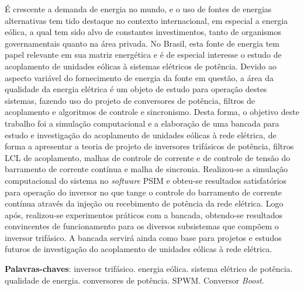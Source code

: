 \begin{resumo}
 
É crescente a demanda de energia no mundo, e o uso de fontes de energias alternativas tem tido destaque no contexto 
internacional, em especial a energia eólica, a qual tem sido alvo de constantes investimentos, tanto de organismos 
governamentais quanto na área privada. No Brasil, esta fonte de energia tem papel relevante em sua matriz energética e 
é de especial interesse o estudo de acoplamento de unidades eólicas à sistemas elétricos de potência. 
Devido ao aspecto variável do fornecimento de energia da fonte em questão, a área da qualidade da energia elétrica 
é um objeto de estudo para operação destes sistemas, fazendo uso do projeto de conversores de potência, filtros de 
acoplamento e algoritmos de controle e sincronismo. Desta forma, o objetivo deste trabalho foi a simulação computacional 
e a elaboração de uma bancada para estudo e investigação do acoplamento de unidades eólicas à rede elétrica, de forma 
a apresentar a teoria de projeto de inversores trifásicos de potência, filtros LCL de acoplamento, 
malhas de controle de corrente e de controle de tensão do barramento de corrente contínua e malha de sincronia. Realizou-se a 
simulação computacional do sistema no \textit{software} PSIM e obteu-se resultados satisfatórios para operação 
do inversor no que tange o controle do barramento de corrente contínua através da injeção ou recebimento de potência da 
rede elétrica. Logo após, realizou-se experimentos práticos com a bancada, obtendo-se resultados 
convincentes de funcionamento para os diversos subsistemas que compõem o inversor trifásico. 
A bancada servirá ainda como base para projetos e estudos futuros de investigação do acoplamento 
de unidades eólicas à rede elétrica.


 \vspace{\onelineskip}
    
 \noindent
 \textbf{Palavras-chaves}: inversor trifásico. energia eólica. sistema elétrico de potência. qualidade de energia. conversores de potência. SPWM. Conversor \textit{Boost}.
\end{resumo}

